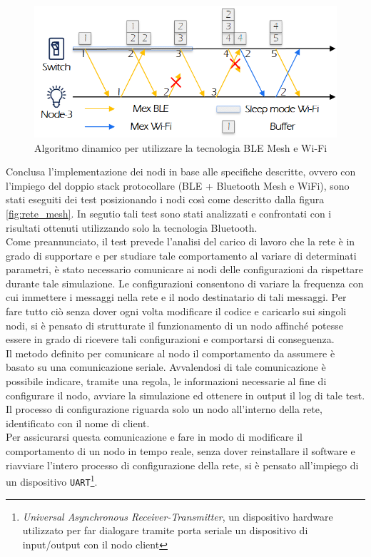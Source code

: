 \begin{figure}[!ht]
    \centering
    \includegraphics[width = \textwidth]{images/Algoritmo_dinamico.png}
    \caption{Algoritmo dinamico per utilizzare la tecnologia BLE Mesh e Wi-Fi}
    \label{fig:algoritmo dinamico}
\end{figure}

\noindent Conclusa l'implementazione dei nodi in base alle specifiche descritte, ovvero con l'impiego del doppio stack protocollare (BLE + Bluetooth Mesh e WiFi), sono stati eseguiti dei test posizionando i nodi così come descritto dalla figura \ref{fig:rete_mesh}. In segutio tali test sono stati analizzati e confrontati con i risultati ottenuti utilizzando solo la tecnologia Bluetooth.\\

\noindent Come preannunciato, il test prevede l'analisi del carico di lavoro che la rete è in grado di supportare e per studiare tale comportamento al variare di determinati parametri, è stato necessario comunicare ai nodi delle configurazioni da rispettare durante tale simulazione. Le configurazioni consentono di variare la frequenza con cui immettere i messaggi nella rete e il nodo destinatario di tali messaggi. Per fare tutto ciò senza dover ogni volta modificare il codice e caricarlo sui singoli nodi, si è pensato di strutturate il funzionamento di un nodo affinché potesse essere in grado di ricevere tali configurazioni e comportarsi di conseguenza.\\
Il metodo definito per comunicare al nodo il comportamento da assumere è basato su una comunicazione seriale. Avvalendosi di tale comunicazione è possibile indicare, tramite una regola, le informazioni necessarie al fine di configurare il nodo, avviare la simulazione ed ottenere in output il log di tale test.\\
Il processo di configurazione riguarda solo un nodo all'interno della rete, identificato con il nome di client.\\
Per assicurarsi questa comunicazione e fare in modo di modificare il comportamento di un nodo in tempo reale, senza dover reinstallare il software e riavviare l'intero processo di configurazione della rete, si è pensato all'impiego di un dispositivo \texttt{UART}\footnote{\textit{Universal Asynchronous Receiver-Transmitter}, un dispositivo hardware utilizzato per far dialogare tramite porta seriale un dispositivo di input/output con il nodo client}.\\

